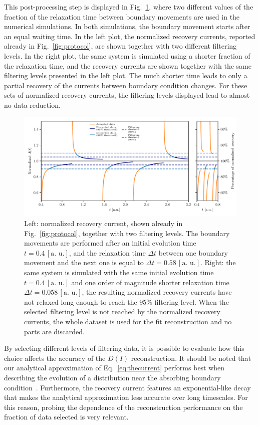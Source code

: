 This post-processing step is displayed in Fig.~\ref{fig:postprocessing}, where two different values of the fraction of the relaxation time between boundary movements are used in the numerical simulations. In both simulations, the boundary movement starts after an equal waiting time. In the left plot, the normalized recovery currents, reported already in Fig.~\ref{fig:protocol}, are shown together  with two different filtering levels. In the right plot, the same system is simulated using a shorter fraction of the relaxation time, and the recovery currents are shown together with the same filtering levels presented in the left plot. The much shorter time leads to only a partial recovery of the currents between boundary condition changes. For these sets of normalized recovery currents, the filtering levels displayed lead to almost no data reduction.
%
\begin{figure}[htp]
    \centering 
    \includegraphics[width=\textwidth]{4_probing_the_diffusive_behavior/figs/final/the_discarded_data.pdf}
    \caption{Left: normalized recovery current, shown already in Fig.~\ref{fig:protocol}, together with two filtering levels. The boundary movements are performed after an initial evolution time $t=0.4 \, [\text{a. u.}]$, and the relaxation time $\Delta t$ between one boundary movement and the next one is equal to $\Delta t=0.58 \, [\text{a. u.}]$. Right: the same system is simulated with the same initial evolution time $t=0.4 \, [\text{a. u.}]$ and one order of magnitude shorter relaxation time $\Delta t=0.058 \, [\text{a. u.}]$, the resulting normalized recovery currents have not relaxed long enough to reach the $95\%$ filtering level. When the selected filtering level is not reached by the normalized recovery currents, the whole dataset is used for the fit reconstruction and no parts are discarded.}
    \label{fig:postprocessing}
\end{figure}
%

By selecting different levels of filtering data, it is possible to evaluate how this choice affects the accuracy of the $D(I)$ reconstruction. It should be noted that our analytical approximation of Eq.~\eqref{eq:thecurrent} performs best when describing the evolution of a distribution near the absorbing boundary condition~\cite{montanari:ipac2021:tupab233}. Furthermore, the recovery current features an exponential-like decay that makes the analytical approximation less accurate over long timescales. For this reason, probing the dependence of the reconstruction performance on the fraction of data selected is very relevant.

